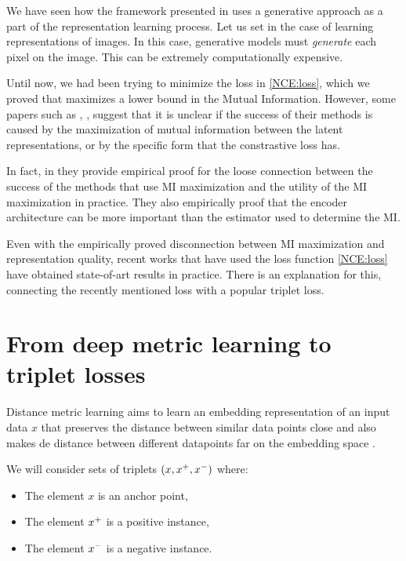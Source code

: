 \label{Chapter:connection:triplets}
We have seen how the framework presented in \cite{oord_et_al} uses a generative approach as a part of the representation learning process. Let us set in the case of learning representations of images. In this case, generative models must \emph{generate} each pixel on the image. This can be extremely computationally expensive. 

Until now, we had been trying to minimize the loss in \ref{NCE:loss}, which we proved that maximizes a lower bound in the Mutual Information. However, some papers such as \cite{chen_simple_2020}, \cite{tschannen_mutual_2020}, suggest that it is unclear if the success of their methods is caused by the maximization of mutual information between the latent representations, or by the specific form that the constrastive loss has.

In fact, in \cite{tschannen_mutual_2020} they provide empirical proof for the loose connection between the success of the methods that use MI maximization and the utility of the MI maximization in practice. They also empirically proof  that the encoder architecture can be more important than the estimator used to determine the MI.

Even with the empirically proved disconnection between MI maximization and representation quality, recent works that have used the loss function \ref{NCE:loss} have obtained state-of-art results in practice. There is an explanation for this, connecting the recently mentioned loss with a popular triplet loss.

\section{From deep metric learning to triplet losses}

Distance metric learning aims to learn an embedding representation of an input data $x$ that preserves the distance between similar data points close and also makes de distance between different datapoints far on the embedding space \citep{Sohn2016ImprovedDM}.

We will consider sets of triplets $(x,x^+,x^-)$ where:
\begin{itemize}
\item The element $x$ is an anchor point,
\item The element $x^+$ is a positive instance,
\item The element $x^-$ is a negative instance.
\end{itemize}


